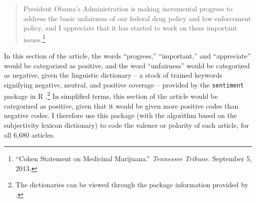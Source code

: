 \begin{quotation}
\begin{singlespace}
\noindent President Obama's Administration is making incremental progress to address the basic unfairness of our federal drug policy and law enforcement policy, and I appreciate that it has started to work on these important issues.\footnote{``Cohen Statement on Medicinal Marijuana.'' \textit{Tennessee Tribune}. September 5, 2013.}
\end{singlespace}
\end{quotation}

In this section of the article, the words ``progress,'' ``important,'' and ``appreciate'' would be categorized as positive, and the word ``unfairness'' would be categorized as negative, given the linguistic dictionary -- a stock of trained keywords signifying negative, neutral, and positive coverage -- provided by the \texttt{sentiment} package in \textsf{R} \citep{jurka_2012}.\footnote{The dictionaries can be viewed through the package information provided by \citet{jurka_2012}.} In simplified terms, this section of the article would be categorized as positive, given that it would be given more positive codes than negative codes. I therefore use this package (with the algorithm based on the subjectivity lexicon dictionary) to code the valence or polarity of each article, for all 6,680 articles. 







